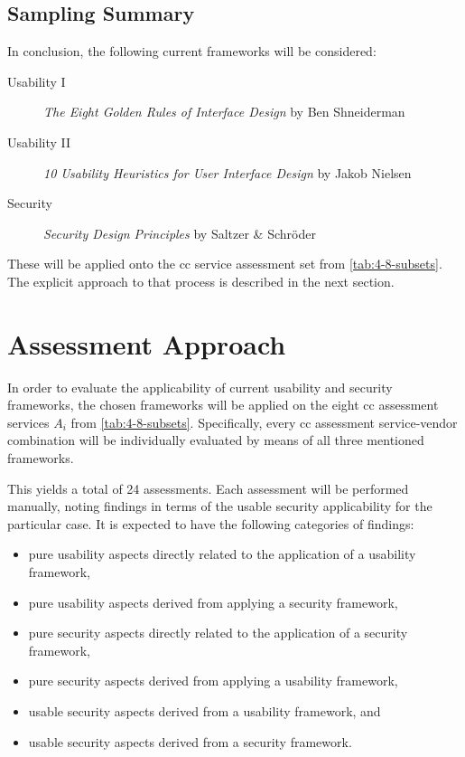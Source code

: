 \subsection{Sampling Summary}
In conclusion, the following current frameworks will be considered:

\begin{description}
	\item[Usability I] \textit{The Eight Golden Rules of Interface Design} by Ben Shneiderman
	\item[Usability II] \textit{10 Usability Heuristics for User Interface Design} by Jakob Nielsen
	\item[Security] \textit{Security Design Principles} by Saltzer \& Schröder
\end{description}

These will be applied onto the \ac{cc} service assessment set from \autoref{tab:4-8-subsets}. The explicit approach to that process is described in the next section.

\section{Assessment Approach}
In order to evaluate the applicability of current usability and security frameworks, the chosen frameworks will be applied on the eight \ac{cc} assessment services $A_{i}$ from \autoref{tab:4-8-subsets}. Specifically, every \ac{cc} assessment service-vendor combination will be individually evaluated by means of all three mentioned frameworks.

This yields a total of 24 assessments. Each assessment will be performed manually, noting findings in terms of the usable security applicability for the particular case. It is expected to have the following categories of findings:

\begin{itemize}
	\item pure usability aspects directly related to the application of a usability framework,
	\item pure usability aspects derived from applying a security framework,
	\item pure security aspects directly related to the application of a security framework,
	\item pure security aspects derived from applying a usability framework,
	\item usable security aspects derived from a usability framework, and
	\item usable security aspects derived from a security framework.
\end{itemize}

